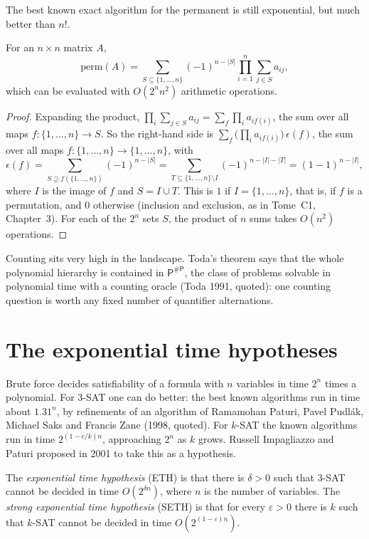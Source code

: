 The best known exact algorithm for the permanent is still exponential, but much better than $n!$.

\begin{proposition}[Ryser 1963]\label{prop:ryser}
For an $n\times n$ matrix $A$,
\[
\mathrm{perm}(A)=\sum_{S\subseteq\{1,\dots,n\}}(-1)^{n-|S|}\prod_{i=1}^n\sum_{j\in S}a_{ij},
\]
which can be evaluated with $O(2^nn^2)$ arithmetic operations.
\end{proposition}

\begin{proof}
Expanding the product, $\prod_i\sum_{j\in S}a_{ij}=\sum_f\prod_ia_{if(i)}$, the sum over all maps $f:\{1,\dots,n\}\to S$. So the right-hand side is $\sum_f\bigl(\prod_ia_{if(i)}\bigr)\,\epsilon(f)$, the sum over all maps $f:\{1,\dots,n\}\to\{1,\dots,n\}$, with
\[
\epsilon(f)=\sum_{S\supseteq f(\{1,\dots,n\})}(-1)^{n-|S|}=\sum_{T\subseteq\{1,\dots,n\}\setminus I}(-1)^{n-|I|-|T|}=(1-1)^{n-|I|},
\]
where $I$ is the image of $f$ and $S=I\cup T$. This is $1$ if $I=\{1,\dots,n\}$, that is, if $f$ is a permutation, and $0$ otherwise (inclusion and exclusion, as in Tome~C1, Chapter~3). For each of the $2^n$ sets $S$, the product of $n$ sums takes $O(n^2)$ operations.
\end{proof}

Counting sits very high in the landscape. Toda's theorem says that the whole polynomial hierarchy is contained in $\mathsf P^{\#\mathsf P}$, the class of problems solvable in polynomial time with a counting oracle (Toda 1991, quoted): one counting question is worth any fixed number of quantifier alternations.

\section{The exponential time hypotheses}\label{sec:seth}

Brute force decides satisfiability of a formula with $n$ variables in time $2^n$ times a polynomial. For 3-SAT one can do better: the best known algorithms run in time about $1.31^n$, by refinements of an algorithm of Ramamohan Paturi, Pavel Pudlák, Michael Saks and Francis Zane (1998, quoted). For $k$-SAT the known algorithms run in time $2^{(1-c/k)n}$, approaching $2^n$ as $k$ grows. Russell Impagliazzo and Paturi proposed in 2001 to take this as a hypothesis.

\begin{definition}\label{def:eth}
The \emph{exponential time hypothesis} (ETH) is that there is $\delta>0$ such that 3-SAT cannot be decided in time $O(2^{\delta n})$, where $n$ is the number of variables. The \emph{strong exponential time hypothesis} (SETH) is that for every $\varepsilon>0$ there is $k$ such that $k$-SAT cannot be decided in time $O(2^{(1-\varepsilon)n})$.
\end{definition}

